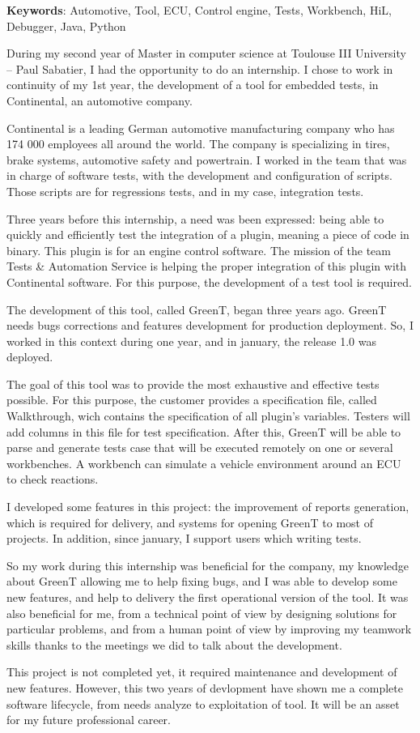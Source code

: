 \textbf{Keywords}: Automotive, Tool, ECU, Control engine, Tests, Workbench, HiL, Debugger, Java, Python

During my second year of Master in computer science at Toulouse III University – Paul Sabatier,
I had the opportunity to do an internship. I chose to work in continuity of my 1st year, the development
of a tool for embedded tests, in Continental, an automotive company.

Continental is a leading German automotive manufacturing company who has 174 000 employees
all around the world. The company is specializing in tires, brake systems, automotive safety
and powertrain. I worked in the team that was in charge of software tests, with the development
and configuration of scripts. Those scripts are for regressions tests, and in my case, integration tests.

Three years before this internship, a need was been expressed: being able to quickly and efficiently
test the integration of a plugin, meaning a piece of code in binary. This plugin is for an
engine control software. The mission of the team Tests \& Automation Service is helping the proper
integration of this plugin with Continental software. For this purpose, the development of a test
tool is required.

The development of this tool, called GreenT, began three years ago. GreenT needs bugs corrections
and features development for production deployment. So, I worked in this context during
one year, and in january, the release 1.0 was deployed.

The goal of this tool was to provide the most exhaustive and effective tests possible. For
this purpose, the customer provides a specification file, called Walkthrough, wich contains the specification
of all plugin's variables. Testers will add columns in this file for test specification. After
this, GreenT will be able to parse and generate tests case that will be executed remotely on one
or several workbenches. A workbench can simulate a vehicle environment around an ECU to check
reactions.

I developed some features in this project: the improvement of reports generation, which is required for delivery, and systems 
for opening GreenT to most of projects. In addition, since january, I support users which writing tests.

So my work during this internship was beneficial for the company, my knowledge about GreenT
allowing me to help fixing bugs, and I was able to develop some new features, and help to delivery the first operational version of the tool.
It was also beneficial for me, from a technical point of view by designing solutions for particular
problems, and from a human point of view by improving my teamwork skills thanks to the meetings
we did to talk about the development.

This project is not completed yet, it required maintenance and development of new features. However, this two years of devlopment have shown me a complete software lifecycle, from needs analyze to exploitation of tool. It will be an asset for my future professional career.